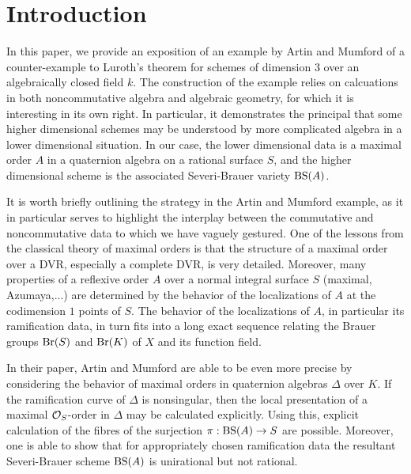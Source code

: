 \section{Introduction}
In this paper, we provide an exposition of an example by Artin and Mumford \cite{artin1972some} of a counter-example to Luroth's theorem for schemes of dimension $3$ over an algebraically closed field $k$.  The construction of the example relies on calcuations in both noncommutative algebra and algebraic geometry, for which it is interesting in its own right.  In particular, it demonstrates the principal that some higher dimensional schemes may be understood by more complicated algebra in a lower dimensional situation.  In our case, the lower dimensional data is a maximal order $A$ in a quaternion algebra on a rational surface $S$, and the higher dimensional scheme is the associated Severi-Brauer variety $\textnormal{BS}(A)$.

It is worth briefly outlining the strategy in the Artin and Mumford example, as it in particular serves to highlight the interplay between the commutative and noncommutative data to which we have vaguely gestured.  One of the lessons from the classical theory of maximal orders is that the structure of a maximal order over a DVR, especially a complete DVR, is very detailed.  Moreover, many properties of a reflexive order $A$ over a normal integral surface $S$ (maximal, Azumaya,...) are determined by the behavior of the localizations of $A$ at the codimension $1$ points of $S$.  The behavior of the localizations of $A$, in particular its ramification data, in turn fits into a long exact sequence relating the Brauer groups $\textnormal{Br}(S)$ and $\textnormal{Br}(K)$ of $X$ and its function field.

In their paper, Artin and Mumford are able to be even more precise by considering the behavior of maximal orders in quaternion algebras $\Delta$ over $K$.  If the ramification curve of $\Delta$ is nonsingular, then the local presentation of a maximal $\mathcal{O}_S$-order in $\Delta$ may be calculated explicitly.  Using this, explicit calculation of the fibres of the surjection $\pi: \textnormal{BS}(A)\rightarrow S$ are possible.  Moreover, one is able to show that for appropriately chosen ramification data the resultant Severi-Brauer scheme $\textnormal{BS}(A)$ is unirational but not rational.

